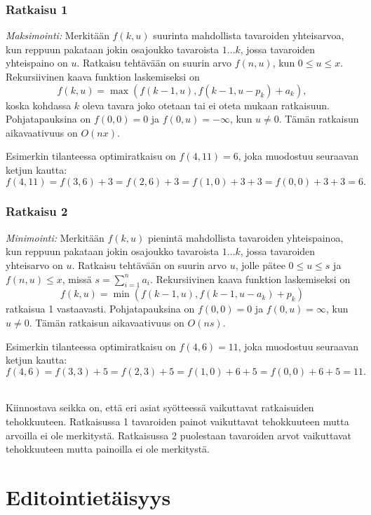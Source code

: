 \subsubsection{Ratkaisu 1}

\textit{Maksimointi:} Merkitään $f(k,u)$
suurinta mahdollista tavaroiden yhteisarvoa,
kun reppuun pakataan jokin osajoukko
tavaroista $1 \ldots k$,
jossa tavaroiden yhteispaino on $u$.
Ratkaisu tehtävään on suurin arvo
$f(n,u)$, kun $0 \le u \le x$.
Rekursiivinen kaava funktion laskemiseksi on
\[f(k,u) = \max(f(k-1,u),f(k-1,u-p_k)+a_k),\]
koska kohdassa $k$ oleva tavara joko otetaan tai ei oteta
mukaan ratkaisuun.
Pohjatapauksina on $f(0,0)=0$ ja $f(0,u)=-\infty$,
kun $u \neq 0$. Tämän ratkaisun aikavaativuus on $O(nx)$.

Esimerkin tilanteessa optimiratkaisu on
$f(4,11)=6$, joka muodostuu seuraavan ketjun kautta:
\[f(4,11)=f(3,6)+3=f(2,6)+3=f(1,0)+3+3=f(0,0)+3+3=6.\]

\subsubsection{Ratkaisu 2}

\textit{Minimointi:} Merkitään $f(k,u)$
pienintä mahdollista tavaroiden yhteispainoa,
kun reppuun pakataan jokin osajoukko
tavaroista $1 \ldots k$,
jossa tavaroiden yhteisarvo on $u$.
Ratkaisu tehtävään on suurin arvo $u$,
jolle pätee $0 \le u \le s$ ja $f(n,u) \le x$,
missä $s=\sum_{i=1}^n a_i$.
Rekursiivinen kaava funktion laskemiseksi on
\[f(k,u) = \min(f(k-1,u),f(k-1,u-a_k)+p_k)\]
ratkaisua 1 vastaavasti.
Pohjatapauksina on $f(0,0)=0$ ja $f(0,u)=\infty$, kun $u \neq 0$.
Tämän ratkaisun aikavaativuus on $O(ns)$.

Esimerkin tilanteessa optimiratkaisu on
$f(4,6)=11$, joka muodostuu seuraavan ketjun kautta:
\[f(4,6)=f(3,3)+5=f(2,3)+5=f(1,0)+6+5=f(0,0)+6+5=11.\]

~\\
Kiinnostava seikka on, että eri asiat syötteessä
vaikuttavat ratkaisuiden tehokkuuteen.
Ratkaisussa 1 tavaroiden painot vaikuttavat tehokkuuteen
mutta arvoilla ei ole merkitystä.
Ratkaisussa 2 puolestaan tavaroiden arvot vaikuttavat
tehokkuuteen mutta painoilla ei ole merkitystä.

\section{Editointietäisyys}


